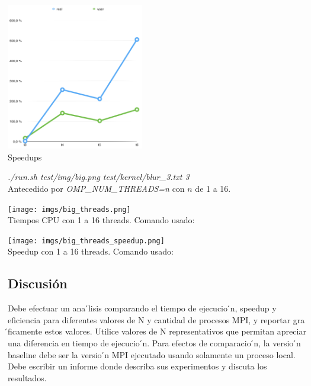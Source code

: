 \documentclass[10pt]{extarticle}
\begin{document}
\begin{center}
 \includegraphics[width=6cm]{imgs/graph_speedup.png}\\
 \footnotesize{Speedups}\\
\end{center}


\textit{./run.sh test/img/big.png test/kernel/blur\_3.txt 3}\\

Antecedido por \textit{OMP\_NUM\_THREADS=n} con $n$ de 1 a 16.\\

\begin{center}
 \texttt{[image: imgs/big\_threads.png]}\\
 \footnotesize{Tiempos CPU con 1 a 16 threads. Comando usado:}\\
\end{center}


\begin{center}
 \texttt{[image: imgs/big\_threads\_speedup.png]}\\
 \footnotesize{Speedup con 1 a 16 threads. Comando usado:}\\
\end{center}

\subsection*{Discusión}
Debe efectuar un ana ́lisis comparando el tiempo de ejecucio ́n, speedup y eficiencia para diferentes valores de N y cantidad de procesos MPI, y reportar gra ́ficamente estos valores. Utilice valores de N representativos que permitan apreciar una diferencia en tiempo de ejecucio ́n.
Para efectos de comparacio ́n, la versio ́n baseline debe ser la versio ́n MPI ejecutado usando solamente un proceso local.
Debe escribir un informe donde describa sus experimentos y discuta los resultados.
\end{document}
